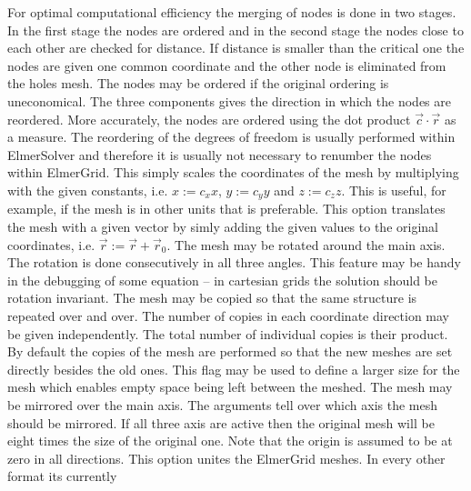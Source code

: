 For optimal computational efficiency the merging of nodes is done 
in two stages. In the first stage the nodes are ordered and in the second
stage the nodes close to each other are checked for distance. 
If distance is smaller than the critical one the nodes are given one
common coordinate and the other node is eliminated from the holes mesh.
%
The nodes may be ordered if the original ordering is uneconomical.
The three components gives the direction in which the nodes are reordered.
More accurately, the nodes are ordered using the 
dot product $\vec{c}\cdot\vec{r}$ as a measure.
%
The reordering of the degrees of freedom is usually performed 
within ElmerSolver and therefore 
it is usually not necessary to renumber the nodes within ElmerGrid.
%
%
This simply scales the coordinates of the mesh by 
multiplying with the given constants, i.e.
$x:=c_x x$, $y:=c_y y$ and $z:=c_z z$.
This is useful, for example, if the mesh is in other units that is 
preferable. 
%
This option translates the mesh with a given vector by
simly adding the given values to the original coordinates,
i.e. $\vec{r} := \vec{r} + \vec{r}_0$.
%
The mesh may be rotated around the main axis. 
The rotation is done consecutively in all three angles.
This feature may be handy in the debugging of some equation --
in cartesian grids the solution should be rotation invariant.
%
The mesh may be copied so that the same 
structure is repeated over and over. The number of copies in 
each coordinate direction may be given independently.
The total number of individual copies is their product.
%
By default the copies of the mesh are performed so that the 
new meshes are set directly besides the old ones. This flag may be used to define
a larger size for the mesh which enables empty space being left 
between the meshed.
%
The mesh may be mirrored over the main axis. The arguments 
tell over which axis the mesh should be mirrored. If all three axis
are active then the original mesh will be eight times the size of the original one.
Note that the origin is assumed to be at zero in all directions.
%
This option unites the ElmerGrid meshes. In every other format its currently
